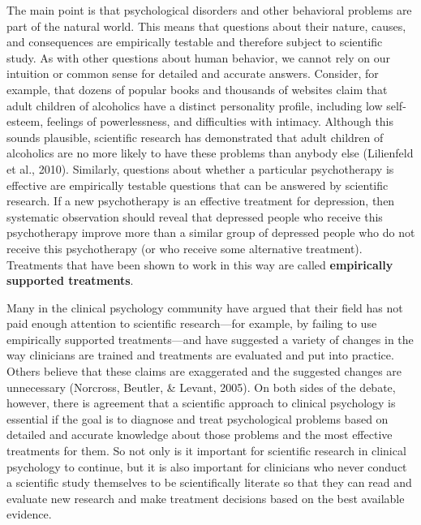 The main point is that psychological disorders and other behavioral problems are part of the natural world. This means that questions about their nature, causes, and consequences are empirically testable and therefore subject to scientific study. As with other questions about human behavior, we cannot rely on our intuition or common sense for detailed and accurate answers. Consider, for example, that dozens of popular books and thousands of websites claim that adult children of alcoholics have a distinct personality profile, including low self-esteem, feelings of powerlessness, and difficulties with intimacy. Although this sounds plausible, scientific research has demonstrated that adult children of alcoholics are no more likely to have these problems than anybody else (Lilienfeld et al., 2010). Similarly, questions about whether a particular psychotherapy is effective are empirically testable questions that can be answered by scientific research. If a new psychotherapy is an effective treatment for depression, then systematic observation should reveal that depressed people who receive this psychotherapy improve more than a similar group of depressed people who do not receive this psychotherapy (or who receive some alternative treatment). Treatments that have been shown to work in this way are called \textbf{empirically supported treatments}.

Many in the clinical psychology community have argued that their field has not paid enough attention to scientific research---for example, by failing to use empirically supported treatments---and have suggested a variety of changes in the way clinicians are trained and treatments are evaluated and put into practice. Others believe that these claims are exaggerated and the suggested changes are unnecessary (Norcross, Beutler, \& Levant, 2005). On both sides of the debate, however, there is agreement that a scientific approach to clinical psychology is essential if the goal is to diagnose and treat psychological problems based on detailed and accurate knowledge about those problems and the most effective treatments for them. So not only is it important for scientific research in clinical psychology to continue, but it is also important for clinicians who never conduct a scientific study themselves to be scientifically literate so that they can read and evaluate new research and make treatment decisions based on the best available evidence.

